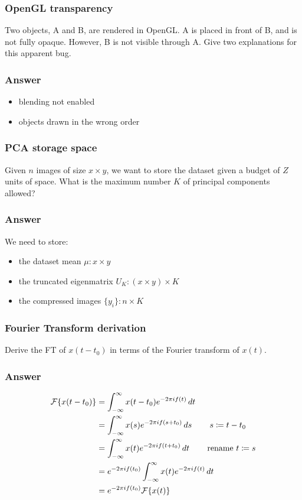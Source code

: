 \documentclass[a4paper,10pt]{article}
\begin{document}
\subsubsection{OpenGL transparency}
Two objects, A and B, are rendered in OpenGL. A is placed in front of B, and is not fully opaque. However, B is not visible through A. Give two explanations for this apparent bug.
\subsubsection{Answer}
\begin{itemize}
    \item blending not enabled
    \item objects drawn in the wrong order
\end{itemize}

\subsubsection{PCA storage space}
Given \( n \) images of size \( x \times y \), we want to store the dataset given a budget of \( Z \) units of space. What is the maximum number \( K \) of principal components allowed?
\subsubsection{Answer}
We need to store:
\begin{itemize}
    \item the dataset mean \( \mu: x \times y \)
    \item the truncated eigenmatrix \( U_K: (x \times y) \times K \)
    \item the compressed images \( \{y_i\}: n \times K \)
\end{itemize}
\subsubsection{Fourier Transform derivation}
Derive the FT of \( x(t-t_{0}) \) in terms of the Fourier transform of \( x(t) \).
\subsubsection{Answer}
\begin{align*}
    \mathcal{F}\{x(t-t_{0})\} &= \int_{-\infty}^\infty x(t-t_{0}) e^{-2\pi i f(t)} \mathop{dt} \\
			      &= \int_{-\infty}^\infty x(s) e^{-2 \pi i f(s + t_{0})} \mathop{ds} \tag*{\( s\coloneqq t-t_{0} \)} \\
			      &= \int_{-\infty}^\infty x(t) e^{-2 \pi if(t+t_{0})} \mathop{dt} \tag*{rename \( t\coloneqq s \)} \\
			      &= e^{-2\pi if(t_0)} \int_{-\infty}^\infty x(t) e^{-2\pi i f(t)} \mathop{dt} \\
			      &= e^{-2\pi if(t_{0})} \mathcal{F}\{x(t)\}
\end{align*}
\end{document}
